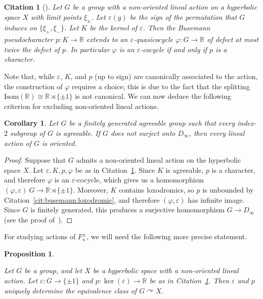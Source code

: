 \documentclass[10pt,a4paper]{article}
\newtheorem{prop}[cdrthm]{Proposition}
\newtheorem{coro}[cdrthm]{Corollary}
\theoremstyle{definition}
\theoremstyle{remark}
\newcommand{\R}{\mathbb{R}}
\theoremstyle{plain}
\newtheorem{cit}[cdrthm]{Citation}
\begin{document}
\begin{cit}[{\cite[Proposition 2.10]{NL}}]
\label{cit:quasicocycle}
    Let $G$ be a group with a non-oriented lineal action on a hyperbolic space $X$ with limit points $\xi_{\pm}$. Let $\varepsilon(g)$ be the sign of the permutation that $G$ induces on $\{ \xi_+, \xi_- \}$. Let $K$ be the kernel of $\varepsilon$. Then the Busemann pseudocharacter $p \colon K \to \R$ extends to an $\varepsilon$-quasicocycle $\varphi \colon G \to \R$ of defect at most twice the defect of $p$. In particular $\varphi$ is an $\varepsilon$-cocycle if and only if $p$ is a character.
\end{cit}

Note that, while $\varepsilon$, $K$, and $p$ (up to sign) are canonically associated to the action, the construction of $\varphi$ requires a choice; this is due to the fact that the splitting $\mathrm{Isom}(\R) \cong \R \rtimes \{ \pm 1 \}$ is not canonical. We can now deduce the following criterion for excluding non-oriented lineal actions.

\begin{coro}\label{cor:nonoriented}
Let $G$ be a finitely generated agreeable group such that every index-$2$ subgroup of $G$ is agreeable. If $G$ does not surject onto $D_\infty$, then every lineal action of $G$ is oriented.
\end{coro}

\begin{proof}
Suppose that $G$ admits a non-oriented lineal action on the hyperbolic space $X$. Let $\varepsilon, K, p, \varphi$ be as in Citation~\ref{cit:quasicocycle}. Since $K$ is agreeable, $p$ is a character, and therefore $\varphi$ is an $\varepsilon$-cocycle, which gives us a homomorphism $(\varphi, \varepsilon) \ G \to \R \rtimes \{ \pm 1 \}$. Moreover, $K$ contains loxodromics, so $p$ is unbounded by Citation~\ref{cit:busemann:loxodromic}, and therefore $(\varphi, \varepsilon)$ has infinite image. Since $G$ is finitely generated, this produces a surjective homomorphism $G \to D_\infty$ (see the proof of~\cite[Proposition 3.1]{NL}).
\end{proof}

For studying actions of $F_n^{\pm}$, we will need the following more precise statement.

\begin{prop}
\label{prop:nonoriented:classification}

Let $G$ be a group, and let $X$ be a hyperbolic space with a non-oriented lineal action. Let $\varepsilon \colon G \to \{ \pm 1 \}$ and $p \colon \ker(\varepsilon) \to \R$ be as in Citation~\ref{cit:quasicocycle}. Then $\varepsilon$ and $p$ uniquely determine the equivalence class of $G \curvearrowright X$.
\end{prop}
\end{document}
